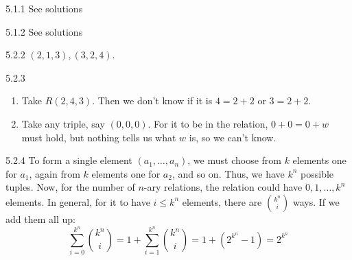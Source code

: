 5.1.1 See solutions

5.1.2 See solutions

5.2.2 \((2,1,3), (3,2,4)\).

5.2.3
\begin{enumerate}
  \item Take \(R(2,4,3)\). Then we don't know if it is \(4 = 2 + 2\) or \(3 =
  2 + 2\).
  \item Take any triple, say \((0,0,0)\). For it to be in the relation, \(0 +
  0 = 0 + w\) must hold, but nothing tells us what \(w\) is, so we can't
  know.
\end{enumerate}

5.2.4
To form a single element \((a_1, \dots, a_n)\), we must choose from \(k\)
elements one for \(a_1\), again from \(k\) elements one for \(a_2\), and so
on. Thus, we have \(k^n\) possible tuples. Now, for the number of \(n\)-ary
relations, the relation could have \(0, 1, \dots, k^n\) elements. In general,
for it to have \(i \leq k^n\) elements, there are \(\binom{k^n}{i}\) ways. If
we add them all up:
\[
  \sum_{i = 0}^{k^n} \binom{k^n}{i} = 1 + \sum_{i = 1}^{k^n} \binom{k^n}{i} = 1 + (2^{k^n} - 1) = 2^{k^n}
\]